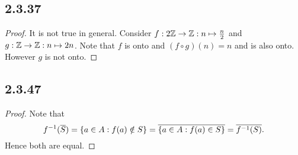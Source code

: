 \documentclass[12pt,titlepage]{extarticle}
\begin{document}
\subsection*{2.3.37}
\begin{proof}
    It is not true in general. Consider $f : 2 \mathbb{Z} \to \mathbb{Z} : n \mapsto \frac{n}{2}$ and $g : \mathbb{Z} \to \mathbb{Z} : n \mapsto 2n$. Note that $f$ is onto and $(f \circ g)(n) = n$ and is also onto. However $g$ is not onto.
\end{proof}

\subsection*{2.3.47}
\begin{proof}
    Note that
    \[
        f^{-1}(\overline{S}) = \qty{a \in A : f(a) \notin S} = \overline{\qty{a \in A : f(a) \in S}} = \overline{f^{-1}(S)}
    .\]
    Hence both are equal.
\end{proof}
\end{document}
